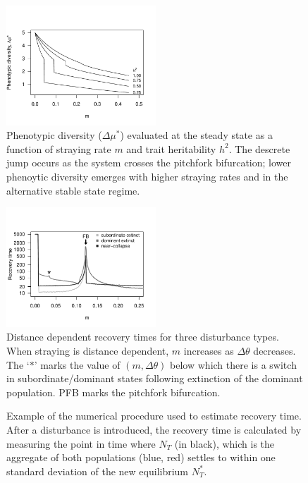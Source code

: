 \documentclass{revtex4}
\newcommand{\beginsupplement}{%
        \clearpage
        \setcounter{table}{0}
        \renewcommand{\thetable}{S\arabic{table}}%
        \setcounter{figure}{0}
        \renewcommand{\thefigure}{S\arabic{figure}}%
     }
\begin{document}
\begin{figure}
  \captionsetup{justification=raggedright,
singlelinecheck=false
}
\centering
\includegraphics[width=0.5\textwidth]{fig_traitdiff.pdf}
\caption{
Phenotypic diversity ($\Delta \mu^*$) evaluated at the steady state as a function of straying rate $m$ and trait heritability $h^2$. The descrete jump occurs as the system crosses the pitchfork bifurcation; lower phenoytic diversity emerges with higher straying rates and in the alternative stable state regime. 
} \label{fig:traitdiff}
\end{figure}

\begin{figure}
  \captionsetup{justification=raggedright,
singlelinecheck=false
}
  \centering
  \includegraphics[width=0.5\textwidth]{fig_mtheta_rt.pdf}
  \caption{
  Distance dependent recovery times for three disturbance types. When straying is distance dependent, $m$ increases as $\Delta\theta$ decreases.
  The `$*$' marks the value of $(m,\Delta\theta)$ below which there is a switch in subordinate/dominant states following extinction of the dominant population.
  PFB marks the pitchfork bifurcation.
  } \label{fig:mtheta}
\end{figure}





\beginsupplement


\begin{figure}
  \captionsetup{justification=raggedright,
singlelinecheck=false
}
\centering
\caption{
Example of the numerical procedure used to estimate recovery time. After a disturbance is introduced, the recovery time is calculated by measuring the point in time where $N_T$ (in black), which is the aggregate of both populations (blue, red) settles to within one standard deviation of the new equilibrium $N_T^*$. 
} \label{fig:recovery}
\end{figure}
\end{document}
